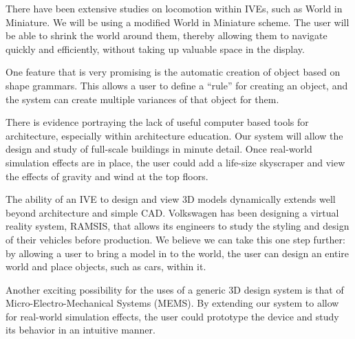 There have been extensive studies on locomotion within IVEs, such as World in Miniature\cite{Pausch:WorldInMiniature}.
We will be using a modified World in Miniature scheme.
The user will be able to shrink the world around them, thereby allowing them to navigate quickly and efficiently, without taking up valuable space in the display.

One feature that is very promising is the automatic creation of object based on shape grammars\cite{Goswell:ShapeGrammer}.
This allows a user to define a ``rule'' for creating an object, and the system can create multiple variances of that object for them.

There is evidence portraying the lack of useful computer based tools for architecture, especially within architecture education\cite{Dobson:Architecture}.
Our system will allow the design and study of full-scale buildings in minute detail.
Once real-world simulation effects are in place, the user could add a life-size skyscraper and view the effects of gravity and wind at the top floors.

The ability of an IVE to design and view 3D models dynamically extends well beyond architecture and simple CAD.
Volkswagen has been designing a virtual reality system, RAMSIS, that allows its engineers to study the styling and design of their vehicles before production\cite{Purschke:Cars}.
We believe we can take this one step further: by allowing a user to bring a model in to the world, the user can design an entire world and place objects, such as cars, within it.

Another exciting possibility for the uses of a generic 3D design system is that of Micro-Electro-Mechanical Systems (MEMS)\cite{Zhao:MEMS}.
By extending our system to allow for real-world simulation effects, the user could prototype the device and study its behavior in an intuitive manner.
